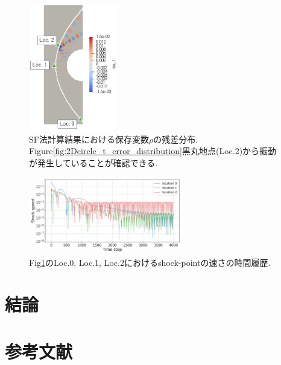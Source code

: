 \documentclass[a4j]{jarticle}
\begin{document}
\begin{figure}[h]
    \begin{center}
        \includegraphics[width=0.35\textwidth]{2Dcirc_res_1.pdf}
    \end{center}
    \caption{SF法計算結果における保存変数$\rho$の残差分布.
    Figure\ref{fig:2Dcircle_t_error_distribution}黒丸地点(Loc.2)から振動が発生していることが確認できる.}
    \label{fig:2Dcircle_res1_distribution}
\end{figure}
\begin{figure}[H]
    \begin{center}
    \hspace*{-15mm} %
        \includegraphics[width=0.6\textwidth]{2Dcirc_shock_speed_conv.pdf}
    \end{center}
    \caption{Fig\ref{fig:2Dcircle_res1_distribution}のLoc.0, Loc.1, Loc.2におけるshock-pointの速さの時間履歴.}
    \label{fig:2Dcircle_speed_conv}
\end{figure}


\section{結論} \label{sec:conclusion}
\clearpage
\section*{参考文献}
\end{document}
